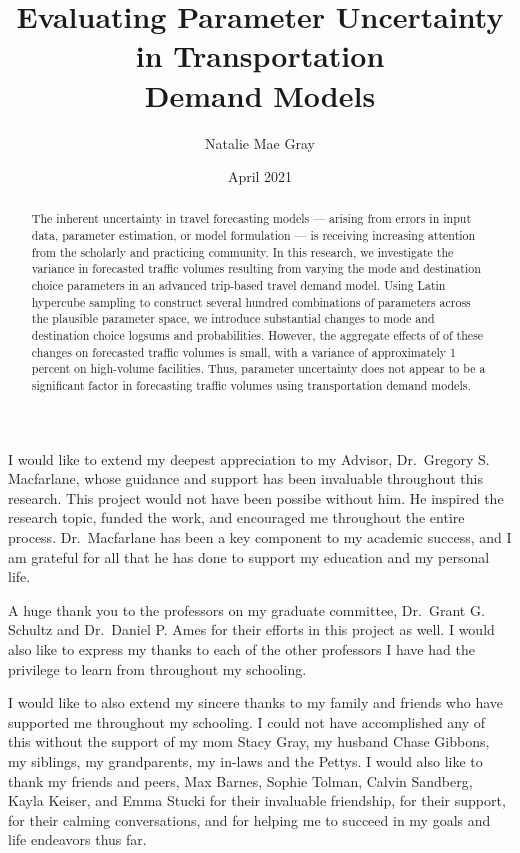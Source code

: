 \documentclass[fancy, masters]{byuthesis}
\title{Evaluating Parameter Uncertainty in Transportation\\
Demand Models}
\author{Natalie Mae Gray}
\date{April 2021}
\begin{document}
	\frontmatter

	\titlepage
	\cleardoublepage

	\customtitlepage
	\cleardoublepage


    \begin{abstract}
  The inherent uncertainty in travel forecasting models --- arising from errors in input data, parameter estimation, or model formulation --- is receiving increasing attention from the scholarly and practicing community. In this research, we investigate the variance in forecasted traffic volumes resulting from varying the mode and destination choice parameters in an advanced trip-based travel demand model. Using Latin hypercube sampling to construct several hundred combinations of parameters across the plausible parameter space, we introduce substantial changes to mode and destination choice logsums and probabilities. However, the aggregate effects of of these changes on forecasted traffic volumes is small, with a variance of approximately 1 percent on high-volume facilities. Thus, parameter uncertainty does not appear to be a significant factor in forecasting traffic volumes using transportation demand models.
  \end{abstract}
  	\cleardoublepage


    \begin{acknowledgments}
  I would like to extend my deepest appreciation to my Advisor, Dr.~Gregory S. Macfarlane, whose guidance and support has been invaluable throughout this research. This project would not have been possibe without him. He inspired the research topic, funded the work, and encouraged me throughout the entire process. Dr.~Macfarlane has been a key component to my academic success, and I am grateful for all that he has done to support my education and my personal life.

  A huge thank you to the professors on my graduate committee, Dr.~Grant G. Schultz and Dr.~Daniel P. Ames for their efforts in this project as well. I would also like to express my thanks to each of the other professors I have had the privilege to learn from throughout my schooling.

  I would like to also extend my sincere thanks to my family and friends who have supported me throughout my schooling. I could not have accomplished any of this without the support of my mom Stacy Gray, my husband Chase Gibbons, my siblings, my grandparents, my in-laws and the Pettys. I would also like to thank my friends and peers, Max Barnes, Sophie Tolman, Calvin Sandberg, Kayla Keiser, and Emma Stucki for their invaluable friendship, for their support, for their calming conversations, and for helping me to succeed in my goals and life endeavors thus far.
  \end{acknowledgments}
  	\cleardoublepage
\end{document}

